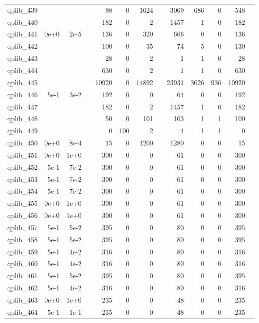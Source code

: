 \begin{table}
\begin{tabular}{lrrrrrrrrrrrr}
qplib\_439	&		&		&	&	98	&	0	&	1624	&	&	3069	&	686	&	0	&	548	\\
qplib\_440	&		&		&	&	182	&	0	&	2	&	&	1457	&	1	&	0	&	182	\\
qplib\_441	&	0e+0	&	2e-5	&	&	136	&	0	&	320	&	&	666	&	0	&	0	&	136	\\
qplib\_442	&		&		&	&	100	&	0	&	35	&	&	74	&	5	&	0	&	130	\\
qplib\_443	&		&		&	&	28	&	0	&	2	&	&	1	&	1	&	0	&	28	\\
qplib\_444	&		&		&	&	630	&	0	&	2	&	&	1	&	1	&	0	&	630	\\
qplib\_445	&		&		&	&	10920	&	0	&	14892	&	&	23931	&	3026	&	936	&	10920	\\
qplib\_446	&	5e-1	&	3e-2	&	&	192	&	0	&	0	&	&	64	&	0	&	0	&	192	\\
qplib\_447	&		&		&	&	182	&	0	&	2	&	&	1457	&	1	&	0	&	182	\\
qplib\_448	&		&		&	&	50	&	0	&	101	&	&	103	&	1	&	1	&	100	\\
qplib\_449	&		&		&	&	0	&	100	&	2	&	&	4	&	1	&	1	&	0	\\
qplib\_450	&	0e+0	&	8e-4	&	&	15	&	0	&	1200	&	&	1280	&	0	&	0	&	15	\\
qplib\_451	&	0e+0	&	1e+0	&	&	300	&	0	&	0	&	&	61	&	0	&	0	&	300	\\
qplib\_452	&	5e-1	&	7e-2	&	&	300	&	0	&	0	&	&	61	&	0	&	0	&	300	\\
qplib\_453	&	5e-1	&	7e-2	&	&	300	&	0	&	0	&	&	61	&	0	&	0	&	300	\\
qplib\_454	&	5e-1	&	7e-2	&	&	300	&	0	&	0	&	&	61	&	0	&	0	&	300	\\
qplib\_455	&	0e+0	&	1e+0	&	&	300	&	0	&	0	&	&	61	&	0	&	0	&	300	\\
qplib\_456	&	0e+0	&	1e+0	&	&	300	&	0	&	0	&	&	61	&	0	&	0	&	300	\\
qplib\_457	&	5e-1	&	5e-2	&	&	395	&	0	&	0	&	&	80	&	0	&	0	&	395	\\
qplib\_458	&	5e-1	&	5e-2	&	&	395	&	0	&	0	&	&	80	&	0	&	0	&	395	\\
qplib\_459	&	5e-1	&	4e-2	&	&	316	&	0	&	0	&	&	80	&	0	&	0	&	316	\\
qplib\_460	&	5e-1	&	4e-2	&	&	316	&	0	&	0	&	&	80	&	0	&	0	&	316	\\
qplib\_461	&	5e-1	&	5e-2	&	&	395	&	0	&	0	&	&	80	&	0	&	0	&	395	\\
qplib\_462	&	5e-1	&	4e-2	&	&	316	&	0	&	0	&	&	80	&	0	&	0	&	316	\\
qplib\_463	&	0e+0	&	1e+0	&	&	235	&	0	&	0	&	&	48	&	0	&	0	&	235	\\
qplib\_464	&	5e-1	&	1e-1	&	&	235	&	0	&	0	&	&	48	&	0	&	0	&	235	\\

\end{tabular}
\end{table}
